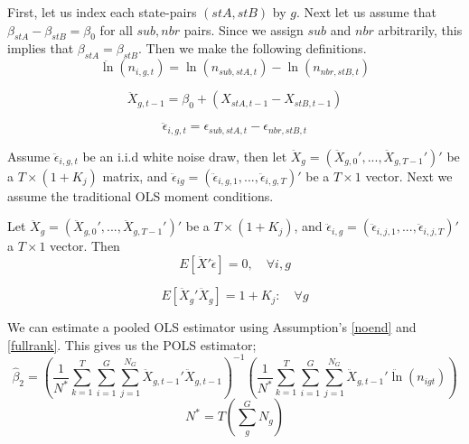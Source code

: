 First, let us index each state-pairs $(stA,stB)$ by $g$. Next let us assume that $\beta_{stA}-\beta_{stB} = \beta_{0}$ for all $sub, nbr$ pairs. Since we assign $sub$ and $nbr$ arbitrarily, this implies that $\beta_{stA} = \beta_{stB}$.  Then we make the following definitions.
\begin{equation}
\ddot \ln(n_{i,g,t}) = \ln(n_{sub,stA,t})-\ln(n_{nbr,stB,t})
\end{equation}

\begin{equation}
\ddot X_{g,t-1} = \beta_{0}+(X_{stA,t-1}-X_{stB,t-1})
\end{equation}

\begin{equation}
\ddot \epsilon_{i,g,t} = \epsilon_{sub,stA,t}-\epsilon_{nbr,stB,t}
\end{equation}

Assume $\ddot \epsilon_{i,g,t}$ be an i.i.d white noise draw, then let $\ddot X_{g} = (\ddot X_{g,0}',...,\ddot X_{g,T-1}')'$ be a $T \times (1+K_{j})$ matrix, and $\ddot \epsilon_{ig} = (\ddot \epsilon_{i,g,1},...,\ddot \epsilon_{i,g,T})'$ be a $T \times 1$ vector. Next we assume the traditional OLS moment conditions.

\begin{assumption}\label{noend}
Let  $\ddot X_{g} = (\ddot X_{g,0}', ... ,\ddot X_{g,T-1}')'$ be a $T \times (1+K_{j})$, and $\ddot \epsilon_{i,g} = (\ddot\epsilon_{i,j,1},...,\ddot\epsilon_{i,j,T})'$ a $T \times 1$ vector. Then 
\begin{equation}E[\ddot X'\ddot \epsilon] = 0, \quad \forall i,g\end{equation}
\end{assumption}

\begin{assumption}\label{fullrank}
 \begin{equation}E[\ddot X_{g}'\ddot X_{g}] = 1+K_{j}: \quad \forall g\end{equation}
\end{assumption}

We can estimate a pooled OLS estimator using Assumption's \ref{noend} and \ref{fullrank}. This gives us the POLS estimator;
\begin{equation}\label{pols}
\hat \beta_{2} = \left(\frac{1}{N^{*}} \sum_{k=1}^{T}\sum_{i=1}^{G}\sum_{j=1}^{N_{G}}\ddot X_{g,t-1}'\ddot X_{g,t-1}\right)^{-1}\left(\frac{1}{N^{*}}\sum_{k=1}^{T}\sum_{i=1}^{G}\sum_{j=1}^{N_{G}}\ddot X_{g,t-1}'\ddot \ln(n_{igt})\right)
\end{equation}
\begin{equation}
N^{*} = T(\sum_{g}^{G}N_{g})
\end{equation}

